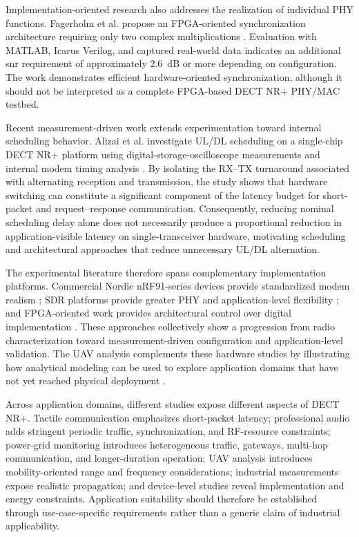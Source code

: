 Implementation-oriented research also addresses the realization of individual
PHY functions. Fagerholm et al. propose an FPGA-oriented synchronization
architecture requiring only two complex multiplications
\cite{fagerholmFPGAbasedDECT2020New2024}. Evaluation with MATLAB, Icarus
Verilog, and captured real-world data indicates an additional \gls{snr}
requirement of approximately 2.6~dB or more depending on configuration. The
work demonstrates efficient hardware-oriented synchronization, although it
should not be interpreted as a complete FPGA-based DECT NR+ PHY/MAC testbed.

Recent measurement-driven work extends experimentation toward internal
scheduling behavior. Alizai et al. investigate UL/DL scheduling on a
single-chip DECT NR+ platform using digital-storage-oscilloscope measurements
and internal modem timing analysis
\cite{alizaiMeasurementDrivenLatencyAnalysis2026}. By isolating the RX--TX
turnaround associated with alternating reception and transmission, the study
shows that hardware switching can constitute a significant component of the
latency budget for short-packet and request--response communication.
Consequently, reducing nominal scheduling delay alone does not necessarily
produce a proportional reduction in application-visible latency on
single-transceiver hardware, motivating scheduling and architectural
approaches that reduce unnecessary UL/DL alternation.

The experimental literature therefore spans complementary implementation
platforms. Commercial Nordic nRF91-series devices provide standardized modem
realism
\cite{durreDECT2020NRProfessional2024,
bandaraExperimentalValidationAnalysis2025,
grafWhatExpectWhen2026,
mudriievskyiCHEAP5GDECT2024a,
piresDECT2020NREnergy2026b}; SDR platforms provide greater PHY and
application-level flexibility
\cite{wassmannPerformanceDECT2020NR2024,
poetsProfessionalNetworkedAudio2025}; and FPGA-oriented work provides
architectural control over digital implementation
\cite{fagerholmFPGAbasedDECT2020New2024}. These approaches collectively show
a progression from radio characterization toward measurement-driven
configuration and application-level validation. The UAV analysis complements
these hardware studies by illustrating how analytical modeling can be used to
explore application domains that have not yet reached physical deployment
\cite{jahangirAnalysisPerformanceDECT2024}.

Across application domains, different studies expose different aspects of
DECT NR+. Tactile communication emphasizes short-packet latency; professional
audio adds stringent periodic traffic, synchronization, and RF-resource
constraints; power-grid monitoring introduces heterogeneous traffic, gateways,
multi-hop communication, and longer-duration operation; UAV analysis
introduces mobility-oriented range and frequency considerations; industrial
measurements expose realistic propagation; and device-level studies reveal
implementation and energy constraints. Application suitability should
therefore be established through use-case-specific requirements rather than a
generic claim of industrial applicability.


